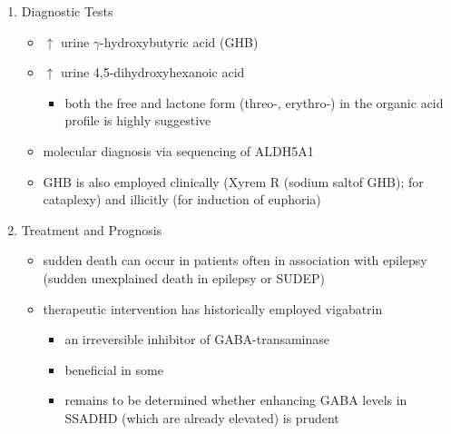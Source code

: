 \documentclass[12pt]{scrartcl}
\begin{document}
\begin{enumerate}
\item Diagnostic Tests
\label{sec:orga30ccc2}
\begin{itemize}
\item \(\uparrow\) urine \(\gamma\)-hydroxybutyric acid (GHB)
\item \(\uparrow\) urine 4,5-dihydroxyhexanoic acid
\begin{itemize}
\item both the free and lactone form (threo-, erythro-) in the organic acid profile
is highly suggestive
\end{itemize}
\item molecular diagnosis via sequencing of ALDH5A1
\item GHB is also employed clinically (Xyrem R (sodium saltof GHB); for
cataplexy) and illicitly (for induction of euphoria)
\end{itemize}

\item Treatment and Prognosis
\label{sec:org98acc9b}
\begin{itemize}
\item sudden death can occur in patients often in association with
epilepsy (sudden unexplained death in epilepsy or SUDEP)
\item therapeutic intervention has historically employed vigabatrin
\begin{itemize}
\item an irreversible inhibitor of GABA-transaminase
\item beneficial in some
\item remains to be determined whether enhancing GABA levels in SSADHD
(which are already elevated) is prudent
\end{itemize}
\end{itemize}
\end{enumerate}
\end{document}
